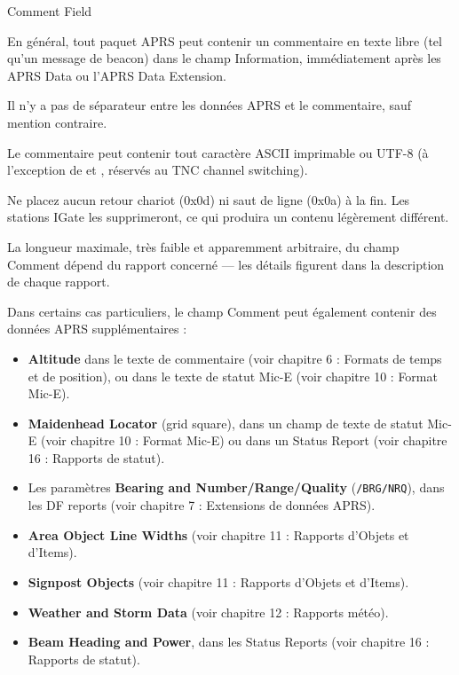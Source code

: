 \begin{aprssideblock}{Comment Field}
\label{comment-field}
En général, tout paquet APRS peut contenir un commentaire en texte libre
(tel qu'un message de beacon) dans le champ Information, immédiatement après
les APRS Data ou l'APRS Data Extension.

Il n'y a pas de séparateur entre les données APRS et le commentaire, sauf
mention contraire.

Le commentaire peut contenir tout caractère ASCII imprimable ou UTF-8 (à
l'exception de \lit{\textbar{}} et \lit{\textasciitilde{}}, réservés au TNC
channel switching).

Ne placez aucun retour chariot (0x0d) ni saut de ligne (0x0a) à la fin. Les
stations IGate les supprimeront, ce qui produira un contenu légèrement
différent.

La longueur maximale, très faible et apparemment arbitraire, du champ
Comment dépend du rapport concerné --- les détails figurent dans la
description de chaque rapport.

Dans certains cas particuliers, le champ Comment peut également contenir des
données APRS supplémentaires :

\begin{itemize}
\tightlist
\item
  \textbf{Altitude} dans le texte de commentaire (voir chapitre 6 : Formats
  de temps et de position), ou dans le texte de statut Mic-E (voir chapitre
  10 : Format Mic-E).
\item
  \textbf{Maidenhead Locator} (grid square), dans un champ de texte de
  statut Mic-E (voir chapitre 10 : Format Mic-E) ou dans un Status Report
  (voir chapitre 16 : Rapports de statut).
\item
  Les paramètres \textbf{Bearing and Number/Range/Quality}
  (\texttt{/BRG/NRQ}), dans les DF reports (voir chapitre 7 : Extensions de
  données APRS).
\item
  \textbf{Area Object Line Widths} (voir chapitre 11 : Rapports d'Objets et
  d'Items).
\item
  \textbf{Signpost Objects} (voir chapitre 11 : Rapports d'Objets et
  d'Items).
\item
  \textbf{Weather and Storm Data} (voir chapitre 12 : Rapports météo).
\item
  \textbf{Beam Heading and Power}, dans les Status Reports (voir chapitre
  16 : Rapports de statut).
\end{itemize}
\end{aprssideblock}


